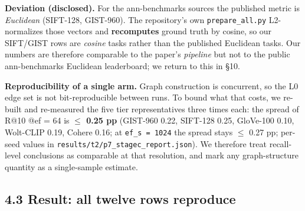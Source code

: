 \documentclass[
  10pt,
]{article}
\begin{document}
\textbf{Deviation (disclosed).} For the ann-benchmarks sources the
published metric is \emph{Euclidean} (SIFT-128, GIST-960). The
repository's own \texttt{prepare\_all.py} L2-normalizes those vectors
and \textbf{recomputes} ground truth by cosine, so our SIFT/GIST rows
are \emph{cosine} tasks rather than the published Euclidean tasks. Our
numbers are therefore comparable to the paper's \emph{pipeline} but not
to the public ann-benchmarks Euclidean leaderboard; we return to this in
§10.

\textbf{Reproducibility of a single arm.} Graph construction is
concurrent, so the L0 edge set is not bit-reproducible between runs. To
bound what that costs, we re-built and re-measured the five tier
representatives three times each: the spread of R@10 @ef = 64 is
\textbf{$\leq$ 0.25 pp} (GIST-960 0.22, SIFT-128 0.25, GloVe-100 0.10,
Wolt-CLIP 0.19, Cohere 0.16; at \texttt{ef\_s\ =\ 1024} the spread stays
$\leq$ 0.27 pp; per-seed values in
\texttt{results/t2/p7\_stagec\_report.json}). We therefore treat
recall-level conclusions as comparable at that resolution, and mark any
graph-structure quantity as a single-sample estimate.

\subsection{4.3 Result: all twelve rows
reproduce}\label{result-all-twelve-rows-reproduce}
\end{document}
